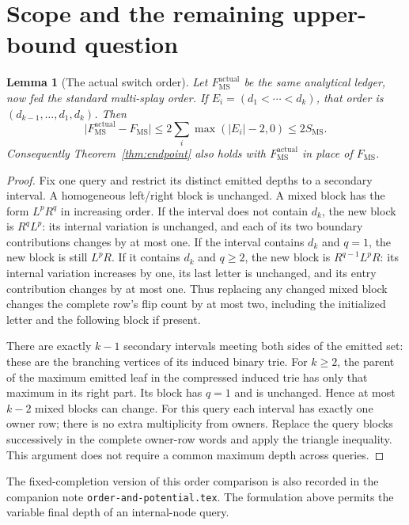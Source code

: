 \documentclass[11pt]{article}
\newtheorem{lemma}[theorem]{Lemma}
\newcommand{\MS}{\mathrm{MS}}
\begin{document}
\section{Scope and the remaining upper-bound question}

\begin{lemma}[The actual switch order]\label{lem:order}
Let $F_{\MS}^{\mathrm{actual}}$ be the same analytical ledger, now fed
the standard multi-splay order. If
$E_i=(d_1<\cdots<d_k)$, that order is
$(d_{k-1},\ldots,d_1,d_k)$. Then
\[
 \bigl|F_{\MS}^{\mathrm{actual}}-F_{\MS}\bigr|
 \le 2\sum_i\max(|E_i|-2,0)\le2S_{\MS}.
\]
Consequently Theorem~\ref{thm:endpoint} also holds with
$F_{\MS}^{\mathrm{actual}}$ in place of $F_{\MS}$.
\end{lemma}
\begin{proof}
Fix one query and restrict its distinct emitted depths to a secondary
interval. A homogeneous left/right block is unchanged. A mixed block
has the form $L^pR^q$ in increasing order. If the interval does not
contain $d_k$, the new block is $R^qL^p$: its internal variation is
unchanged, and each of its two boundary contributions changes by at
most one. If the interval contains $d_k$ and $q=1$, the new block is
still $L^pR$. If it contains $d_k$ and $q\ge2$, the new block is
$R^{q-1}L^pR$: its internal variation increases by one, its last letter
is unchanged, and its entry contribution changes by at most one.
Thus replacing any changed mixed block changes the complete row's
flip count by at most two, including the initialized letter and the
following block if present.

There are exactly $k-1$ secondary intervals meeting both sides of the
emitted set: these are the branching vertices of its induced binary
trie. For $k\ge2$, the parent of the maximum emitted leaf in the
compressed induced trie has only that maximum in its right part.
Its block has $q=1$ and is unchanged. Hence at most $k-2$ mixed blocks
can change. For this query each interval has exactly one owner row;
there is no extra multiplicity from owners. Replace the query blocks
successively in the complete owner-row words and apply the triangle
inequality. This argument does not require a common maximum depth
across queries.
\end{proof}

The fixed-completion version of this order comparison is also recorded
in the companion note \texttt{order-and-potential.tex}. The formulation
above permits the variable final depth of an internal-node query.
\end{document}
